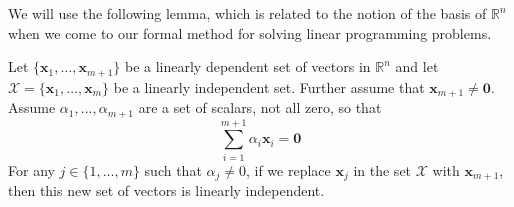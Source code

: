 We will use the following lemma, which is related to the notion of the basis of $\mathbb{R}^n$ when we come to our formal method for solving linear programming problems.

\begin{lemma} Let $\{\mathbf{x}_1,\dots,\mathbf{x}_{m+1}\}$ be a linearly dependent set of vectors in $\mathbb{R}^n$ and let $\mathcal{X} = \{\mathbf{x}_1,\dots,\mathbf{x}_{m}\}$ be a linearly independent set. Further assume that $\mathbf{x}_{m+1} \neq \mathbf{0}$. Assume $\alpha_1,\dots,\alpha_{m+1}$ are a set of scalars, not all zero, so that 
\begin{equation}
\sum_{i=1}^{m+1}\alpha_i\mathbf{x}_i = \mathbf{0}
\end{equation}
For any $j \in \{1,\dots,m\}$ such that $\alpha_j \neq 0$, if we replace $\mathbf{x}_j$ in the set $\mathcal{X}$ with $\mathbf{x}_{m+1}$, then this new set of vectors is linearly independent.
\label{lem:ExchangeLemma} 
\end{lemma}
